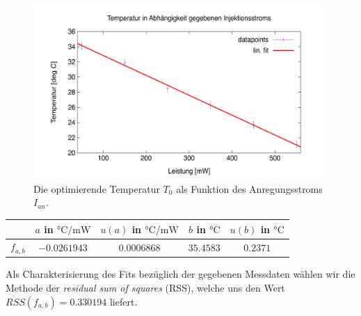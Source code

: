 \documentclass[../../main.tex]{subfiles}
\begin{document}
    \begin{figure}[H]
        \centering
        \includegraphics[width=11cm]{../../Bilddateien/1-2/Rasterung_EvalMin_chgI.png}
        \caption{Die optimierende Temperatur $T_0$ als Funktion des Anregungsstroms $I_{\textit{an}}$.}
        \label{fig:1-2:RasterungEvalMinChgI}
    \end{figure}

    \begin{table}[H]
        \centering
        \begin{tabular}{c|cc|cc}
            \hline
            & $a$ in $\si{\celsius\per\mW}$ & $u(a)$ in $\si{\celsius\per\mW}$ & $b$ in $\si{\celsius}$ & $u(b)$ in $\si{\celsius}$ \\
            \hline\hline
            $f_{a,b}$ & $-0.0261943$ & $0.0006868$ & $35.4583$ & $0.2371$ \\
            \hline
        \end{tabular}
    \end{table}
    Als Charakterisierung des Fits bezüglich der gegebenen Messdaten wählen wir die Methode der \emph{residual sum of squares} (RSS), welche uns den Wert $RSS(f_{a,b}) = 0.330194$ liefert. 
\end{document}
